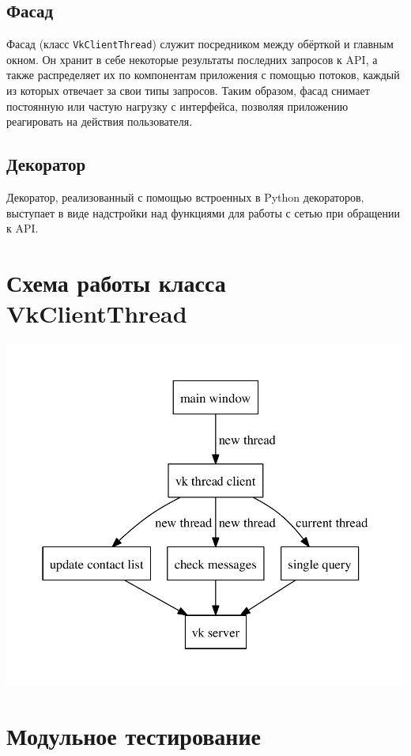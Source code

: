 \documentclass[12pt]{article}
\begin{document}
\subsection{Фасад}
Фасад (класс {\tt VkClientThread}) служит посредником между обёрткой и главным окном. Он хранит в себе некоторые результаты последних запросов к API, а также распределяет их по компонентам приложения с помощью потоков, каждый из которых отвечает за свои типы запросов. Таким образом, фасад снимает постоянную или частую нагрузку с интерфейса, позволяя приложению реагировать на действия пользователя.

\subsection{Декоратор}
Декоратор, реализованный с помощью встроенных в Python декораторов, выступает в виде надстройки над функциями для работы с сетью при обращении к API.



\section{Схема работы класса VkClientThread}
\includegraphics{./diag/work_logic.pdf}



\newpage
\section{Модульное тестирование}
\end{document}
